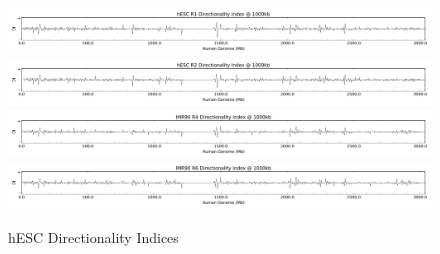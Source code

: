 \begin{figure}[H]
  \centering
  \caption{hESC Directionality Indices}\label{fig:hescDirectionalityIndices}
  \includegraphics[width=\textwidth]{./figures/supplementary/directions/hESC-R1-1000kb.png}
  \vfill
  \includegraphics[width=\textwidth]{./figures/supplementary/directions/hESC-R2-1000kb.png}
  \vfill
  \includegraphics[width=\textwidth]{./figures/supplementary/directions/IMR90-R4-1000kb.png}
  \vfill
  \includegraphics[width=\textwidth]{./figures/supplementary/directions/IMR90-R6-1000kb.png}
\end{figure}

